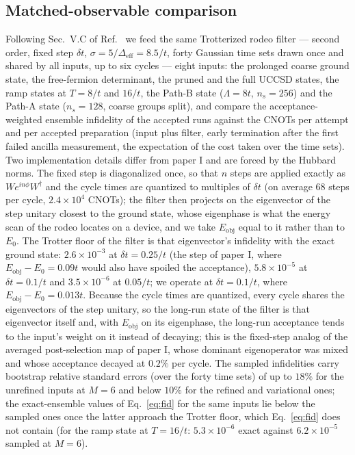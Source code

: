 \documentclass[
  aps,
  prc,
  reprint,
  superscriptaddress,
  floatfix,
  nofootinbib
]{revtex4-2}
\newcommand{\Eobj}{E_{\mathrm{obj}}}
\newcommand{\Deff}{\Delta_{\mathrm{eff}}}
\begin{document}
\subsection{Matched-observable comparison}
\label{sec:budget}
Following Sec.~V.C of Ref.~\cite{EigenQPairing2026} we feed the same
Trotterized rodeo filter --- second order, fixed step $\delta t$,
$\sigma=5/\Deff=8.5/t$, forty Gaussian time sets drawn once and shared by
all inputs, up to six cycles --- eight inputs: the prolonged coarse ground
state, the free-fermion determinant, the pruned and the full UCCSD states,
the ramp states at $T=8/t$ and $16/t$, the Path-B state ($\Lambda=8t$,
$n_s=256$) and the Path-A state ($n_s=128$, coarse groups split), and
compare the acceptance-weighted ensemble infidelity of the accepted runs
against the CNOTs per attempt and per accepted preparation (input plus
filter, early termination after the first failed ancilla measurement, the
expectation of the cost taken over the time sets).  Two implementation
details differ from paper I and are forced by the Hubbard norms.  The fixed
step is diagonalized once, so that $n$ steps are applied exactly as
$We^{in\phi}W^\dagger$ and the cycle times are quantized to multiples of
$\delta t$ (on average $68$ steps per cycle, $2.4\times10^4$ CNOTs); the
filter then projects on the eigenvector of the step unitary closest to the
ground state, whose eigenphase is what the energy scan of the rodeo locates
on a device, and we take $\Eobj$ equal to it rather than to $E_0$.  The
Trotter floor of the filter is that eigenvector's infidelity with the exact
ground state: $2.6\times10^{-3}$ at $\delta t=0.25/t$ (the step of paper I,
where $\Eobj-E_0=0.09t$ would also have spoiled the acceptance),
$5.8\times10^{-5}$ at $\delta t=0.1/t$ and $3.5\times10^{-6}$ at $0.05/t$;
we operate at $\delta t=0.1/t$, where $\Eobj-E_0=0.013t$.  Because the
cycle times are quantized, every cycle shares the eigenvectors of the step
unitary, so the long-run state of the filter is that eigenvector itself
and, with $\Eobj$ on its eigenphase, the long-run acceptance tends to the
input's weight on it instead of decaying; this is the fixed-step analog
of the averaged post-selection map of paper I, whose dominant eigenoperator
was mixed and whose acceptance decayed at $0.2\%$ per cycle.  The sampled
infidelities carry bootstrap relative standard errors (over the forty time
sets) of up to $18\%$ for the unrefined inputs at $M=6$ and below $10\%$
for the refined and variational ones; the exact-ensemble values of
Eq.~\eqref{eq:fid} for the same inputs lie below the sampled ones once the
latter approach the Trotter floor, which Eq.~\eqref{eq:fid} does not
contain (for the ramp state at $T=16/t$: $5.3\times10^{-6}$ exact against
$6.2\times10^{-5}$ sampled at $M=6$).
\end{document}
